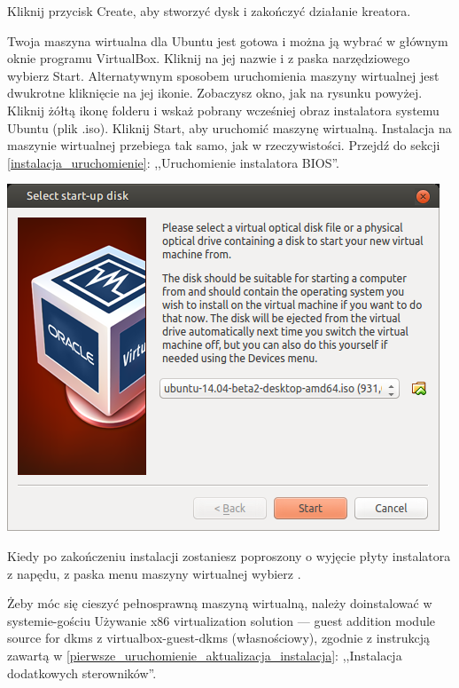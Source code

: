 Kliknij przycisk \textcolor{ubuntu_orange}{Create}, aby stworzyć dysk i zakończyć działanie kreatora.

Twoja maszyna wirtualna dla Ubuntu jest gotowa i można ją wybrać w głównym oknie programu VirtualBox. Kliknij na jej nazwie i z paska narzędziowego wybierz \textcolor{ubuntu_orange}{Start}. Alternatywnym sposobem uruchomienia maszyny wirtualnej jest dwukrotne kliknięcie na jej ikonie. Zobaczysz okno, jak na rysunku powyżej. Kliknij żółtą ikonę folderu i wskaż pobrany wcześniej obraz instalatora systemu Ubuntu (plik .iso). Kliknij \textcolor{ubuntu_orange}{Start}, aby uruchomić maszynę wirtualną. Instalacja na maszynie wirtualnej przebiega tak samo, jak w rzeczywistości. Przejdź do sekcji \ref{instalacja_uruchomienie}: ,,Uruchomienie instalatora BIOS''.

\begin{center}
	\includegraphics[width=\linewidth]{images/virtualbox_start.png}
\end{center}

Kiedy po zakończeniu instalacji zostaniesz poproszony o wyjęcie płyty instalatora z napędu, z paska menu maszyny wirtualnej wybierz .

Żeby móc się cieszyć pełnosprawną maszyną wirtualną, należy doinstalować w systemie-gościu \textcolor{ubuntu_orange}{Używanie x86 virtualization solution --- guest addition module source for dkms z virtualbox-guest-dkms (własnościowy)}, zgodnie z instrukcją zawartą w \ref{pierwsze_uruchomienie_aktualizacja_instalacja}: ,,Instalacja dodatkowych sterowników''.
